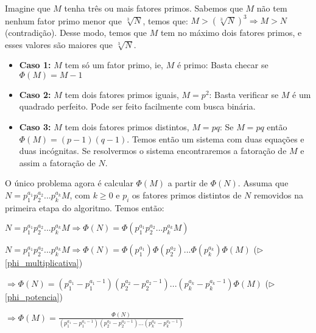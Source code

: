 Imagine que $M$ tenha três ou mais fatores primos. Sabemos que $M$ não tem nenhum fator primo menor que $\sqrt[3]{N}$, temos que: $M > (\sqrt[3]{N})^3 \Rightarrow M > N$ (contradição).
Desse modo, temos que $M$ tem no máximo dois fatores primos, e esses valores são maiores que $\sqrt[3]{N}$.

\begin{itemize}
  \item \textbf{Caso 1:} $M$ tem só um fator primo, ie, $M$ é primo:
		Basta checar se $\Phi(M) = M-1$

  \item \textbf{Caso 2:} $M$ tem dois fatores primos iguais, $M = p ^2$:
		Basta verificar se $M$ é um quadrado perfeito. Pode ser feito facilmente com busca binária.

  \item \textbf{Caso 3:} $M$ tem dois fatores primos distintos, $M = pq$:
		Se $M=pq$ então $\Phi(M) = (p-1)(q-1)$. Temos então um sistema com duas equações e duas incógnitas. Se resolvermos o sistema encontraremos a fatoração de $M$ e assim a fatoração de $N$.
\end{itemize}
O único problema agora é calcular $\Phi(M)$ a partir de $\Phi(N)$. Assuma que $N = p_1^{a_1}p_2^{a_2}...p_k^{a_k}M$, com $k \geq 0$ e 
 $p_i$ os fatores primos distintos de $N$ removidos na primeira etapa do algoritmo. Temos então:

$N = p_1^{a_1}p_2^{a_2}...p_k^{a_k}M \Rightarrow \Phi(N) = \Phi(p_1^{a_1}p_2^{a_2}...p_k^{a_k}M)$

$N = p_1^{a_1}p_2^{a_2}...p_k^{a_k}M \Rightarrow \Phi(N) = \Phi(p_1^{a_1})\Phi(p_2^{a_2})...\Phi(p_k^{a_k})\Phi(M)$ ($\triangleright$ \autoref{phi_multiplicativa})

$\Rightarrow \Phi(N) = (p_1^{a_1}-p_1^{a_1-1})(p_2^{a_2} - p_2^{a_2-1})...(p_k^{a_k}-p_k^{a_k-1})\Phi(M)$ ($\triangleright$ \autoref{phi_potencia})

$\Rightarrow \Phi(M) = \frac{\Phi(N)}{(p_1^{a_1}-p_1^{a_1-1})(p_2^{a_2} - p_2^{a_2-1})...(p_k^{a_k}-p_k^{a_k-1})}$
\clearpage

